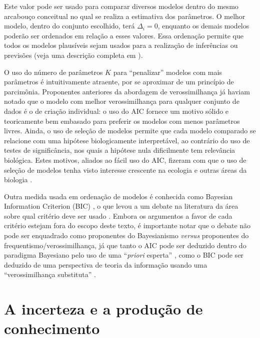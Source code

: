 Este valor pode ser usado para comparar diversos modelos dentro do mesmo arcabouço conceitual no qual se realiza a
estimativa dos parâmetros. O melhor modelo, dentro do conjunto escolhido, terá $\Delta_i = 0$, enquanto os demais
modelos poderão ser ordenados em relação a esses valores. Essa ordenação permite que todos os modelos plausíveis
sejam usados para a realização de inferências ou previsões (veja uma descrição completa em \citep{Burnham02}).

O uso do número de parâmetros $K$ para ``penalizar'' modelos com mais parâmetros é intuitivamente atraente, por
se aproximar de um princípio de parcimônia. Proponentes anteriores da abordagem de verossimilhança já haviam notado
que o modelo com melhor verossimilhança para qualquer conjunto de dados é o de criação individual: o uso do AIC
fornece um motivo sólido e teoricamente bem embasado para preferir os modelos com menos parâmetros livres.
Ainda, o uso de seleção de modelos permite que cada modelo comparado se relacione com uma hipótese biologicamente
interpretável, ao contrário do uso de testes de significância, nos quais a hipótese nula dificilmente tem relevância
biológica. Estes motivos, aliados ao fácil uso do AIC, fizeram com que o uso de seleção de modelos tenha
visto interesse crescente na ecologia e outras áreas da biologia \citep{Johnson04}.

Outra medida usada em ordenação de modelos é conhecida como Bayesian Information Criterion (BIC) \citep{Schwarz78},
o que levou a um debate na literatura da área sobre qual critério deve ser usado \citep{Weakliem99}. Embora os
argumentos a favor de cada critério estejam fora do escopo deste texto, é importante notar que o debate não pode
ser enquadrado como proponentes do Bayesianismo {\em versus} proponentes do frequentismo/verossimilhança, já que
tanto o AIC pode ser deduzido dentro do paradigma Bayesiano pelo uso de uma ``{\em priori} esperta'' 
\citep{Burnham04}, como o BIC pode ser deduzido de uma perspectiva de teoria da informação usando uma 
``verossimilhança substituta'' \citep{Stoica04}.

\section{A incerteza e a produção de conhecimento}\label{sec:ciencia} 

